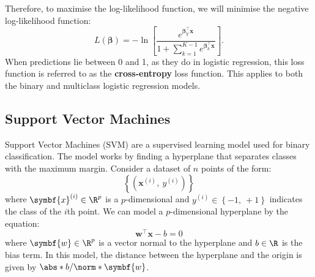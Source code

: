 \documentclass{article}
\begin{document}
Therefore, to maximise the log-likelihood function, we will minimise
the negative log-likelihood function:
\begin{equation*}
    L\left( \symbf{\beta} \right) = -\ln{\left[ \frac{e^{\symbf{\beta}_{y}^\top \symbf{x}}}{1 + \sum_{k = 1}^{K-1} e^{\symbf{\beta}_k^\top \symbf{x}}} \right]}.
\end{equation*}
When predictions lie between 0 and 1, as they do in logistic regression,
this loss function is referred to as the \textbf{cross-entropy} loss
function. This applies to both the binary and multiclass logistic
regression models.
\subsection{Support Vector Machines}
Support Vector Machines (SVM) are a supervised learning model used for
binary classification. The model works by finding a hyperplane that
separates classes with the maximum margin. Consider a dataset of \(n\)
points of the form:
\begin{equation*}
    \left\{ \left( \symbf{x}^{\left( i \right)},\: y^{\left( i \right)} \right) \right\}
\end{equation*}
where \(\symbf{x}^{\left( i \right)} \in \R^p\) is a \(p\)-dimensional
and \(y^{\left( i \right)} \in \left\{ -1,\: {+}1 \right\}\) indicates the
class of the \(i\)th point. We can model a \(p\)-dimensional
hyperplane by the equation:
\begin{equation*}
    \symbf{w}^\top \symbf{x} - b = 0
\end{equation*}
where \(\symbf{w} \in \R^p\) is a vector normal to the hyperplane and
\(b \in \R\) is the bias term. In this model, the distance between the
hyperplane and the origin is given by \(\abs*{b} / \norm*{\symbf{w}}\).
\end{document}
